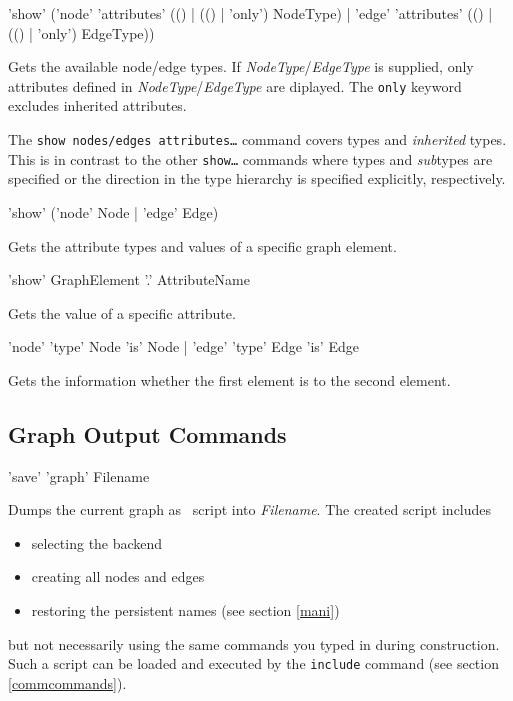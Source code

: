 \begin{rail}
  'show' ('node' 'attributes' (() | (() | 'only') NodeType) | 'edge' 'attributes' (() | (() | 'only') EdgeType))
\end{rail}
Gets the available node/edge  types. If \emph{NodeType}/\emph{EdgeType} is supplied, only attributes defined in \emph{NodeType}/\emph{EdgeType} are diplayed. The \texttt{only} keyword excludes inherited attributes.\\
\begin{note}
The \texttt{show nodes/edges attributes\dots} command covers types and \emph{inherited} types. This is in contrast to the other \texttt{show\dots} commands where types and \emph{sub}types are specified or the direction in the type hierarchy is specified explicitly, respectively.
\end{note}

\begin{rail}
 'show' ('node' Node | 'edge' Edge)
\end{rail}
Gets the attribute types and values of a specific graph element.

\begin{rail}
  'show' GraphElement '.' AttributeName
\end{rail}
Gets the value of a specific attribute.

\begin{rail}
  'node' 'type' Node 'is' Node | 'edge' 'type' Edge 'is' Edge
\end{rail}
Gets the information whether the first element is  to the second element.

\subsection{Graph Output Commands}
\label{outputcmds}

\begin{rail}
  'save' 'graph' Filename
\end{rail}
Dumps the current graph as \GrShell\ script into \emph{Filename}. The created script includes
\begin{itemize}
  \item selecting the backend
  \item creating all nodes and edges
  \item restoring the persistent names (see section \ref{mani})
\end{itemize}
but not necessarily using the same commands you typed in during construction. 
Such a script can be loaded and executed by the \texttt{include} command (see section \ref{commcommands}).

